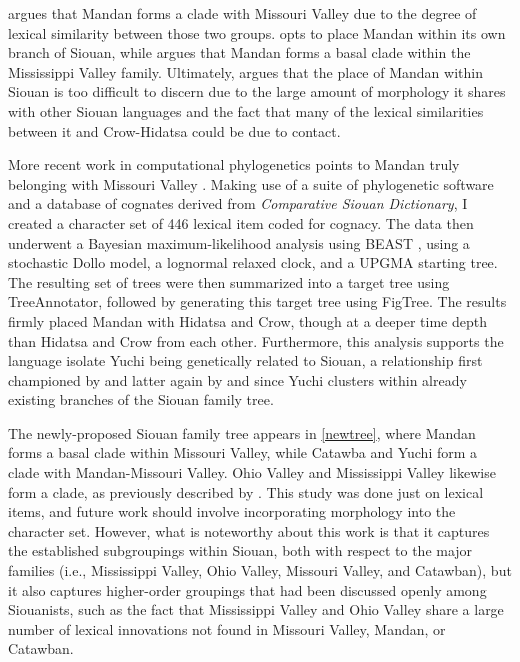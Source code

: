 \citet[54]{headley1971} argues that Mandan forms a clade with Missouri Valley due to the degree of lexical similarity between those two groups. \citet[255]{rood1979} opts to place Mandan within its own branch of Siouan, while \citet{koontz1985} argues that Mandan forms a basal clade within the Mississippi Valley family. Ultimately, \citet{rankin2010} argues that the place of Mandan within Siouan is too difficult to discern due to the large amount of morphology it shares with other Siouan languages and the fact that many of the lexical similarities between it and Crow-Hidatsa could be due to contact.

More recent work in computational phylogenetics points to Mandan truly belonging with Missouri Valley \citep{kasak2015}. Making use of a suite of phylogenetic software and a database of cognates derived from  \textit{Comparative Siouan Dictionary}, I created a character set of 446 lexical item coded for cognacy. The data then underwent a Bayesian maximum-likelihood analysis using BEAST \citep{drummond2007}, using a stochastic Dollo model, a lognormal relaxed clock, and a UPGMA starting tree. The resulting set of trees were then summarized into a target tree using TreeAnnotator, followed by generating this target tree using FigTree. The results firmly placed Mandan with Hidatsa and Crow, though at a deeper time depth than Hidatsa and Crow from each other. Furthermore, this analysis supports the language isolate Yuchi being genetically related to Siouan, a relationship first championed by \citet{sapir1929} and latter again by \citet{rankin1996,rankin1998} and \citet{kasak2016} since Yuchi clusters within already existing branches of the Siouan family tree.

The newly-proposed Siouan family tree appears in \ref{newtree}, where Mandan forms a basal clade within Missouri Valley, while Catawba and Yuchi form a clade with Mandan-Missouri Valley. Ohio Valley and Mississippi Valley likewise form a clade, as previously described by \citet{rankin2010}. This study was done just on lexical items, and future work should involve incorporating morphology into the character set. However, what is noteworthy about this work is that it captures the established subgroupings within Siouan, both with respect to the major families (i.e., Mississippi Valley, Ohio Valley, Missouri Valley, and Catawban), but it also captures higher-order groupings that had been discussed openly among Siouanists, such as the fact that Mississippi Valley and Ohio Valley share a large number of lexical innovations not found in Missouri Valley, Mandan, or Catawban.

